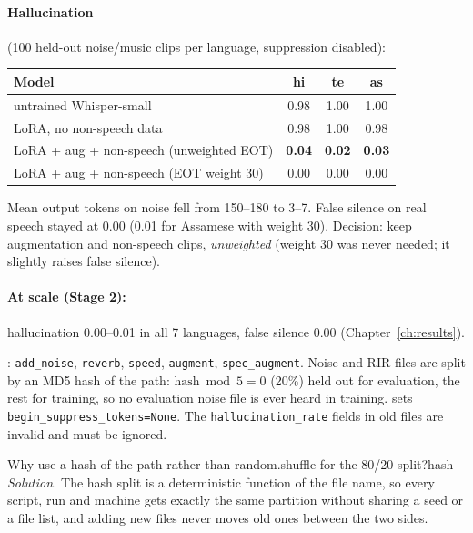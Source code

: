 \paragraph{Hallucination} (100 held-out noise/music clips per language, suppression disabled):
\begin{center}
\begin{tabular}{lccc}
\toprule
Model & hi & te & as\\
\midrule
untrained Whisper-small & 0.98 & 1.00 & 1.00\\
LoRA, no non-speech data & 0.98 & 1.00 & 0.98\\
LoRA + aug + non-speech (unweighted EOT) & \textbf{0.04} & \textbf{0.02} & \textbf{0.03}\\
LoRA + aug + non-speech (EOT weight 30) & 0.00 & 0.00 & 0.00\\
\bottomrule
\end{tabular}
\end{center}
Mean output tokens on noise fell from 150--180 to 3--7. False silence on real speech stayed at 0.00 (0.01 for Assamese with weight 30).
Decision: keep augmentation and non-speech clips, \emph{unweighted} (weight 30 was never needed; it slightly raises false silence).

\paragraph{At scale (Stage 2):} hallucination 0.00--0.01 in all 7 languages, false silence 0.00 (Chapter~\ref{ch:results}).

\begin{incode}
: \texttt{add\_noise}, \texttt{reverb}, \texttt{speed}, \texttt{augment}, \texttt{spec\_augment}. Noise and RIR files
are split by an MD5 hash of the path: $\text{hash}\bmod5=0$ (20\%) held out for evaluation, the rest for training, so no evaluation
noise file is ever heard in training.  sets \texttt{begin\_suppress\_tokens=None}. The
\texttt{hallucination\_rate} fields in old  files are invalid and must be ignored.
\end{incode}

\begin{exercise}{Why use a hash of the path rather than random.shuffle for the 80/20 split?}{hash}
\textit{Solution.} The hash split is a deterministic function of the file name, so every script, run and machine gets exactly the
same partition without sharing a seed or a file list, and adding new files never moves old ones between the two sides.
\end{exercise}
